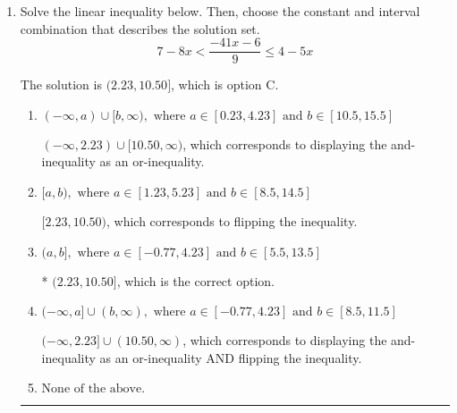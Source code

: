 \documentclass{extbook}[14pt]
\newcommand{\litem}[1]{\item #1

\rule{\textwidth}{0.4pt}}
\begin{document}
\begin{enumerate}
{\begin{enumerate}[label=\Alph*.]
This describes the values less than 4 from 2
\item \( (-\infty, -2) \cup (6, \infty) \)

This describes the values more than 4 from 2
\item \( (-\infty, -2] \cup [6, \infty) \)

This describes the values no less than 4 from 2
\item \( [-2, 6] \)

This describes the values no more than 4 from 2
\item \( \text{None of the above} \)

Options A-D described the values [more/less than] 4 units from 2, which is the reverse of what the question asked.
\end{enumerate}

\textbf{General Comment:} When thinking about this language, it helps to draw a number line and try points.
}
\litem{
Solve the linear inequality below. Then, choose the constant and interval combination that describes the solution set.
\[ 7 - 8 x < \frac{-41 x - 6}{9} \leq 4 - 5 x \]

The solution is \( (2.23, 10.50] \), which is option C.\begin{enumerate}[label=\Alph*.]
\item \( (-\infty, a) \cup [b, \infty), \text{ where } a \in [0.23, 4.23] \text{ and } b \in [10.5, 15.5] \)

$(-\infty, 2.23) \cup [10.50, \infty)$, which corresponds to displaying the and-inequality as an or-inequality.
\item \( [a, b), \text{ where } a \in [1.23, 5.23] \text{ and } b \in [8.5, 14.5] \)

$[2.23, 10.50)$, which corresponds to flipping the inequality.
\item \( (a, b], \text{ where } a \in [-0.77, 4.23] \text{ and } b \in [5.5, 13.5] \)

* $(2.23, 10.50]$, which is the correct option.
\item \( (-\infty, a] \cup (b, \infty), \text{ where } a \in [-0.77, 4.23] \text{ and } b \in [8.5, 11.5] \)

$(-\infty, 2.23] \cup (10.50, \infty)$, which corresponds to displaying the and-inequality as an or-inequality AND flipping the inequality.
\item \( \text{None of the above.} \)


\end{enumerate}

}
\end{enumerate}
\end{document}
